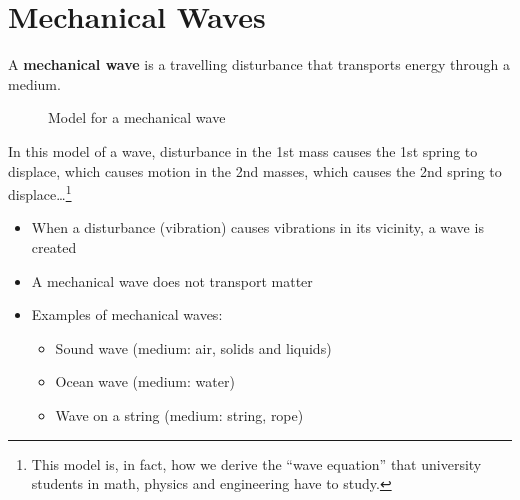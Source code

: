 %

\chapter{Mechanical Waves}
\label{chapter:waves}


A \textbf{mechanical wave} is a travelling disturbance that transports energy
through a medium.
\begin{figure}[ht]
  \centering
  \caption{Model for a mechanical wave}
  \label{fig:wave-model}
\end{figure}
In this model of a wave, disturbance in the 1st mass causes the 1st spring to
displace, which causes motion in the 2nd masses, which causes the 2nd spring
to displace\ldots\footnote{This model is, in fact, how we derive the ``wave
equation'' that university students in math, physics and engineering have
to study.}
%
%
%
%
\begin{itemize}
\item When a disturbance (vibration) causes vibrations in its vicinity, a
  wave is created
\item A mechanical wave does not transport matter
\item Examples of mechanical waves:
  \begin{itemize}
  \item Sound wave (medium: air, solids and liquids)
  \item Ocean wave (medium: water)
  \item Wave on a string (medium: string, rope)
  \end{itemize}
\end{itemize}



